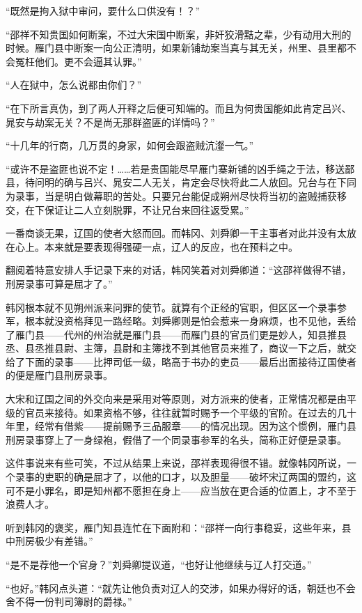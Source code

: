 “既然是拘入狱中审问，要什么口供没有！？”

“邵祥不知贵国如何断案，不过大宋国中断案，非奸狡滑黠之辈，少有动用大刑的时候。雁门县中断案一向公正清明，如果新铺劫案当真与其无关，州里、县里都不会冤枉他们。更不会逼其认罪。”

“人在狱中，怎么说都由你们？”

“在下所言真伪，到了两人开释之后便可知端的。而且为何贵国能如此肯定吕兴、晁安与劫案无关？不是尚无那群盗匪的详情吗？”

“十几年的行商，几万贯的身家，如何会跟盗贼沆瀣一气。”

“或许不是盗匪也说不定！……若是贵国能尽早雁门寨新铺的凶手绳之于法，移送鄙县，待问明的确与吕兴、晁安二人无关，肯定会尽快将此二人放回。兄台与在下同为录事，当是明白做幕职的苦处。只要兄台能促成朔州尽快将当初的盗贼捕获移交，在下保证让二人立刻脱罪，不让兄台来回往返受累。”

一番商谈无果，辽国的使者大怒而回。而韩冈、刘舜卿一干主事者对此并没有太放在心上。本来就是要表现得强硬一点，辽人的反应，也在预料之中。

翻阅着特意安排人手记录下来的对话，韩冈笑着对刘舜卿道：“这邵祥做得不错，刑房录事可算是屈才了。”

韩冈根本就不见朔州派来问罪的使节。就算有个正经的官职，但区区一个录事参军，根本就没资格拜见一路经略。刘舜卿则是怕会惹来一身麻烦，也不见他，丢给了雁门县——代州的州治就是雁门县——而雁门县的官员们更是妙人，知县推县丞、县丞推县尉、主簿，县尉和主簿找不到其他官员来推了，商议一下之后，就交给了下面的录事——比押司低一级，略高于书办的吏员——最后出面接待辽国使者的便是雁门县刑房录事。

大宋和辽国之间的外交向来是采用对等原则，对方派来的使者，正常情况都是由平级的官员来接待。如果资格不够，往往就暂时赐予一个平级的官阶。在过去的几十年里，经常有借紫——提前赐予三品服章——的情况出现。因为这个惯例，雁门县刑房录事穿上了一身绿袍，假借了一个同录事参军的名头，简称正好便是录事。

这件事说来有些可笑，不过从结果上来说，邵祥表现得很不错。就像韩冈所说，一个录事的吏职的确是屈才了，以他的口才，以及胆量——破坏宋辽两国的盟约，这可不是小罪名，即是知州都不愿担在身上——应当放在更合适的位置上，才不至于浪费人才。

听到韩冈的褒奖，雁门知县连忙在下面附和：“邵祥一向行事稳妥，这些年来，县中刑房极少有差错。”

“是不是荐他一个官身？”刘舜卿提议道，“也好让他继续与辽人打交道。”

“也好。”韩冈点头道：“就先让他负责对辽人的交涉，如果办得好的话，朝廷也不会舍不得一份判司簿尉的爵禄。”

